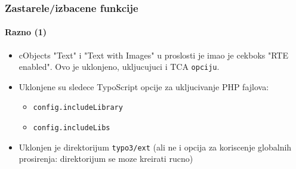 \begin{frame}[fragile]
	\frametitle{Zastarele/izbacene funkcije}
	\framesubtitle{Razno (1)}

	\begin{itemize}

		\item cObjects "Text" i "Text with Images" u proslosti je imao je cekboks "RTE enabled".
			Ovo je uklonjeno, ukljucujuci i TCA \texttt{opciju}.

		\item Uklonjene su sledece TypoScript opcije za ukljucivanje PHP fajlova:

			\begin{itemize}
				\item \texttt{config.includeLibrary}
				\item \texttt{config.includeLibs}
			\end{itemize}

		\item Uklonjen je direktorijum \texttt{typo3/ext}\newline
			\small
				(ali ne i opcija za koriscenje globalnih prosirenja: direktorijum se moze kreirati rucno)
			\normalsize

	\end{itemize}

\end{frame}


